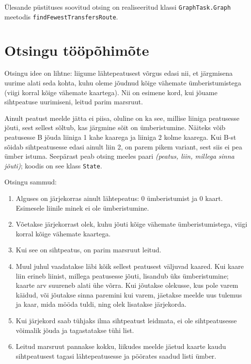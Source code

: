 \documentclass[12pt,a4paper,oneside]{report}
\newcommand{\code}[1]{\texttt{#1}}
\theoremstyle{definition}
\theoremstyle{plain}
\begin{document}
Ülesande püstituses soovitud otsing on realiseeritud klassi
\code{GraphTask.Graph} meetodis \code{findFewestTransfersRoute}.

\section{Otsingu tööpõhimõte}

Otsingu idee on lihtne: liigume lähtepeatusest võrgus edasi nii, et
järgmisena uurime alati seda kohta, kuhu oleme jõudnud kõige vähemate
ümberistumistega (viigi korral kõige vähemate kaartega). Nii on esimene
kord, kui jõuame sihtpeatuse uurimiseni, leitud parim marsruut.

Ainult peatust meelde jätta ei piisa, oluline on ka see, millise liiniga
peatusesse jõuti, sest sellest sõltub, kas järgmine sõit on ümberistumine.
Näiteks võib peatusesse B jõuda liiniga 1 kahe kaarega ja liiniga 2 kolme
kaarega. Kui B-st sõidab sihtpeatusesse edasi ainult liin 2, on parem
pikem variant, sest siis ei pea ümber istuma. Seepärast peab otsing meeles
paari \emph{(peatus, liin, millega sinna jõuti)}; koodis on see klass
\code{State}.

Otsingu sammud:
\begin{enumerate}
  \item Alguses on järjekorras ainult lähtepeatus: 0 ümberistumist ja
        0 kaart. Esimesele liinile minek ei ole ümberistumine.
  \item Võetakse järjekorrast olek, kuhu jõuti kõige vähemate
        ümberistumistega, viigi korral kõige vähemate kaartega.
  \item Kui see on sihtpeatus, on parim marsruut leitud.
  \item Muul juhul vaadatakse läbi kõik sellest peatusest väljuvad kaared.
        Kui kaare liin erineb liinist, millega peatusesse jõuti, lisandub
        üks ümberistumine; kaarte arv suureneb alati ühe võrra. Kui
        jõutakse olekusse, kus pole varem käidud, või jõutakse sinna
        paremini kui varem, jäetakse meelde uus tulemus ja kaar, mida
        mööda tuldi, ning olek lisatakse järjekorda.
  \item Kui järjekord saab tühjaks ilma sihtpeatust leidmata, ei ole
        sihtpeatusesse võimalik jõuda ja tagastatakse tühi list.
  \item Leitud marsruut pannakse kokku, liikudes meelde jäetud kaarte
        kaudu sihtpeatusest tagasi lähtepeatusesse ja pöörates saadud
        listi ümber.
\end{enumerate}
\end{document}
